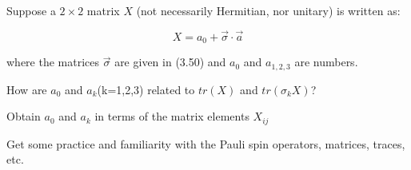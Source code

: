 \begin{question}

  Suppose a $2 \times 2$ matrix $X$ (not necessarily Hermitian, nor unitary) is
  written as:

  \begin{equation*}
    X = a_0 + \vec{\sigma} \cdot \vec{a}
  \end{equation*}

  where the matrices $\vec{\sigma}$ are given in (3.50) and $a_0$ and
  $a_{1,2,3}$ are numbers.

  \begin{questionpart}
    How are $a_0$ and $a_k$(k=1,2,3) related to $tr(X)$ and
    $tr(\sigma_kX)$?
  \end{questionpart}

  \begin{questionpart}
    Obtain $a_0$ and $a_k$ in terms of the matrix elements $X_{ij}$
  \end{questionpart}

\end{question}

\begin{purpose}
  Get some practice and familiarity with the Pauli spin operators,
  matrices, traces, etc.
\end{purpose}

